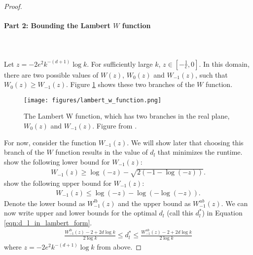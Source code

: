 \begin{proof}
\paragraph{Part 2: Bounding the Lambert $W$ function}\leavevmode\leavevmode\\\\
Let $z = -2e^2k^{-(d+1)}\log k$. For sufficiently large $k$, $z \in [-\frac{1}{e}, 0]$. In this domain, there are two possible values of $W(z)$, $W_0(z)$ and $W_{-1}(z)$, such that $W_0(z) \geq W_{-1}(z)$. Figure \ref{fig:lambert_w_function} shows these two branches of the $W$ function.
\begin{figure}[H]
    \centering
    \texttt{[image: figures/lambert\_w\_function.png]}
    \caption{The Lambert W function, which has two branches in the real plane, $W_0(z)$ and $W_{-1}(z)$. Figure from \cite{lambert}.}
    \label{fig:lambert_w_function}
\end{figure}
For now, consider the function $W_{-1}(z)$. We will show later that choosing this branch of the $W$ function results in the value of $d_l$ that minimizes the runtime.\\  \cite{lambert_bound} show the following lower bound for $W_{-1}(z)$: 
\begin{align}
    W_{-1}(z) \geq \log\left(-z\right)-\sqrt{2\left(-1-\log\left(-z\right)\right)}.
\end{align}
\cite{lambert} show the following upper bound for $W_{-1}(z)$: 
\begin{align}
    W_{-1}(z) \leq \log\left(-z\right)-\log\left( -\log\left(-z\right)\right).
\end{align}
Denote the lower bound as $W_{-1}^{lb}(z)$ and the upper bound as $W_{-1}^{ub}(z)$. We can now write upper and lower bounds for the optimal $d_l$ (call this $d_l^*$) in Equation \ref{eqn:d_l_in_lambert_form}.
\begin{align}
\label{eqn:bounds_dl}
    \frac{W_{-1}^{lb}(z) - 2+2d\log k}{2\log k} \leq d^*_l \leq \frac{W_{-1}^{ub}(z) - 2+2d\log k}{2\log k}
\end{align}
where $z = -2e^2k^{-(d+1)}\log k$ from above.

\end{proof}
